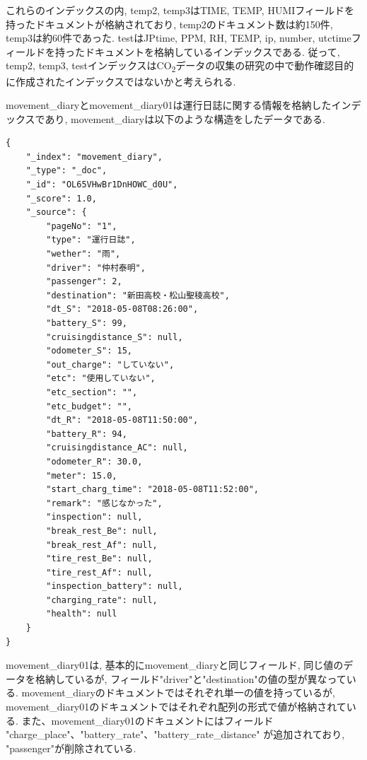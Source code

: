 \documentclass[a4j,12pt,]{jarticle}
\begin{document}
これらのインデックスの内, temp2, temp3はTIME, TEMP, HUMIフィールドを持ったドキュメントが格納されており, temp2のドキュメント数は約150件, temp3は約60件であった.
testはJPtime, PPM, RH, TEMP, ip, number, utctimeフィールドを持ったドキュメントを格納しているインデックスである.
従って, temp2, temp3, testインデックスはCO\textsubscript{2}データの収集の研究の中で動作確認目的に作成されたインデックスではないかと考えられる.

movement\_diaryとmovement\_diary01は運行日誌に関する情報を格納したインデックスであり, movement\_diaryは以下のような構造をしたデータである.

\begin{lstlisting}[caption=movement\_diaryのドキュメントデータ, label=sc1]
  {
    "_index": "movement_diary",
    "_type": "_doc",
    "_id": "OL65VHwBr1DnHOWC_d0U",
    "_score": 1.0,
    "_source": {
        "pageNo": "1",
        "type": "運行日誌",
        "wether": "雨",
        "driver": "仲村泰明",
        "passenger": 2,
        "destination": "新田高校・松山聖稜高校",
        "dt_S": "2018-05-08T08:26:00",
        "battery_S": 99,
        "cruisingdistance_S": null,
        "odometer_S": 15,
        "out_charge": "していない",
        "etc": "使用していない",
        "etc_section": "",
        "etc_budget": "",
        "dt_R": "2018-05-08T11:50:00",
        "battery_R": 94,
        "cruisingdistance_AC": null,
        "odometer_R": 30.0,
        "meter": 15.0,
        "start_charg_time": "2018-05-08T11:52:00",
        "remark": "感じなかった",
        "inspection": null,
        "break_rest_Be": null,
        "break_rest_Af": null,
        "tire_rest_Be": null,
        "tire_rest_Af": null,
        "inspection_battery": null,
        "charging_rate": null,
        "health": null
    }
}
\end{lstlisting}

movement\_diary01は, 基本的にmovement\_diaryと同じフィールド, 同じ値のデータを格納しているが, フィールド"driver"と"destination"の値の型が異なっている.
movement\_diaryのドキュメントではそれぞれ単一の値を持っているが, movement\_diary01のドキュメントではそれぞれ配列の形式で値が格納されている. また、movement\_diary01のドキュメントにはフィールド "charge\_place"、"battery\_rate"、"battery\_rate\_distance" が追加されており, "passenger"が削除されている.
\end{document}
